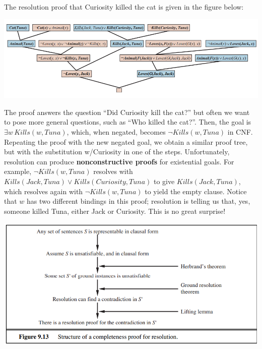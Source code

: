 The resolution proof that Curiosity killed the cat is given in the figure below:
\begin{center}
    \includegraphics[]{images/res-proof-tree.png}
\end{center}
The proof answers the question “Did Curiosity kill the cat?” but often we want to pose more general questions, such as “Who killed the cat?”. Then, the goal is $\exists w \, Kills(w, Tuna)$, which, when negated, becomes $\neg Kills(w, Tuna)$ in CNF. Repeating the proof with the new negated goal, we obtain a similar proof tree, but with the substitution {w/Curiosity} in one of the steps. Unfortunately, resolution can produce \textbf{nonconstructive proofs} for existential goals. For example, $\neg Kills(w, Tuna)$ resolves with $Kills(Jack, Tuna) \lor Kills(Curiosity, Tuna)$ to give $Kills(Jack, Tuna)$, which resolves again with $\neg Kills(w, Tuna)$ to yield the empty clause. Notice that $w$ has two different bindings in this proof; resolution is telling us that, yes, someone killed Tuna, either Jack or Curiosity. This is no great surprise!
\begin{center}
    \includegraphics[]{images/res-completeness-fol.png}
\end{center}

